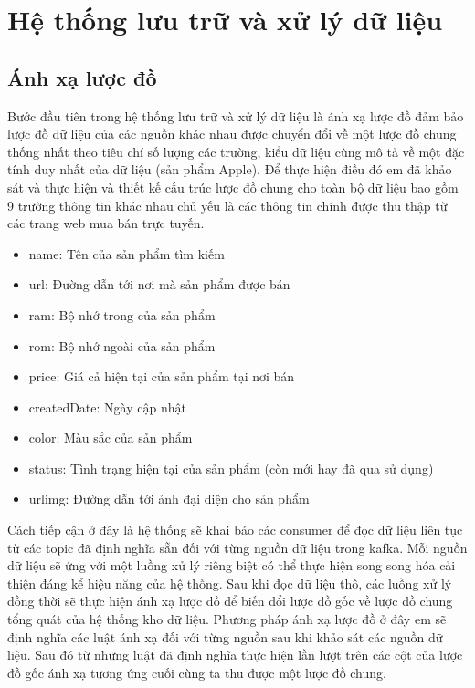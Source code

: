 \documentclass[../DoAn.tex]{subfiles}
\begin{document}
\section{Hệ thống lưu trữ và xử lý dữ liệu}
\subsection{Ánh xạ lược đồ}
Bước đầu tiên trong hệ thống lưu trữ và xử lý dữ liệu là ánh xạ lược đồ  đảm bảo lược đồ  dữ liệu của các nguồn khác nhau được chuyển đổi về một lược đồ chung thống nhất theo tiêu chí số lượng các trường, kiểu dữ liệu cùng mô tả về một đặc tính duy nhất của dữ liệu (sản phẩm Apple). Để thực hiện điều đó em đã khảo sát và thực hiện và thiết kế  cấu trúc lược đồ chung cho toàn bộ dữ liệu bao gồm 9 trường thông tin khác nhau chủ yếu là các thông tin chính được thu thập từ các trang web mua bán trực tuyến.

\begin{itemize}
    \item name: Tên của sản phẩm tìm kiếm
    \item url: Đường dẫn tới nơi mà sản phẩm được bán
    \item ram: Bộ nhớ trong của sản phẩm
    \item rom: Bộ nhớ ngoài của sản phẩm
    \item price: Giá cả hiện tại của sản phẩm tại nơi bán
    \item createdDate: Ngày cập nhật 
    \item color: Màu sắc của sản phẩm
    \item status: Tình trạng hiện tại của sản phẩm (còn mới hay đã qua sử dụng)
    \item urlimg: Đường dẫn tới ảnh đại diện cho sản phẩm
\end{itemize}

Cách tiếp cận ở đây là hệ thống sẽ khai báo các consumer để  đọc dữ liệu liên tục từ các topic đã định nghĩa sẵn đối với từng nguồn dữ liệu trong kafka. Mỗi nguồn dữ liệu sẽ ứng với một luồng xử lý riêng biệt có thể thực hiện song song hóa cải thiện đáng kể hiệu năng của hệ thống. Sau khi đọc dữ liệu thô, các luồng xử lý đồng thời sẽ thực hiện ánh xạ lược đồ để biến đổi lược đồ gốc về lược đồ chung tổng quát của hệ thống kho dữ liệu. Phương pháp ánh xạ lược đồ ở đây em sẽ định nghĩa các luật ánh xạ đối với từng nguồn sau khi khảo sát các nguồn dữ liệu. Sau đó từ những luật đã định nghĩa thực hiện lần lượt trên các cột của lược đồ gốc ánh xạ tương ứng cuối cùng ta thu được một lược đồ chung.
\end{document}
